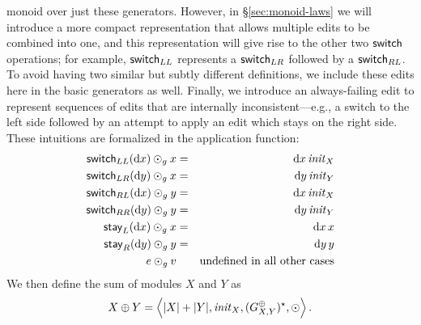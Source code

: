 monoid over just these generators.  However, in 
\S\ref{sec:monoid-laws} we will introduce a more compact
representation that allows multiple edits to be combined into one, and this
representation will give rise to the other two $\mathsf{switch}$ operations; for example,
$\mathsf{switch}_{LL}$ represents a $\mathsf{switch}_{LR}$ followed by a
$\mathsf{switch}_{RL}$.  To avoid having two similar but subtly different
definitions, we include these edits here in the basic generators as well.
%
Finally, we introduce an always-failing edit to represent sequences of edits
that are internally inconsistent---e.g., a switch to the left side followed
by an attempt to apply an edit which stays on the right
side. These intuitions are formalized in the application function:
\begin{eqnarray*}
    \mathsf{switch}_{LL}(\textrm{d} x)\odot_g x &=& {\textrm{d} x\,\mathit{init}_X} \\
    \mathsf{switch}_{LR}(\textrm{d} y)\odot_g x &=& {\textrm{d} y\,\mathit{init}_Y} \\
    \mathsf{switch}_{RL}(\textrm{d} x)\odot_g y &=& {\textrm{d} x\,\mathit{init}_X} \\
    \mathsf{switch}_{RR}(\textrm{d} y)\odot_g y &=& {\textrm{d} y\,\mathit{init}_Y} \\
    \mathsf{stay}_L(\textrm{d} x)\odot_g x &=& {\textrm{d} x\,x} \\
    \mathsf{stay}_R(\textrm{d} y)\odot_g y &=& {\textrm{d} y\,y} \\
    e \odot_g v && \mbox{undefined in all other cases}
\end{eqnarray*}
We then define the sum of modules $X$ and $Y$ as
\[X \oplus Y =
\left<|X|+|Y|,\mlinl{\init_X},(G^\oplus_{X,Y})\LIST,\odot\right>.\]

